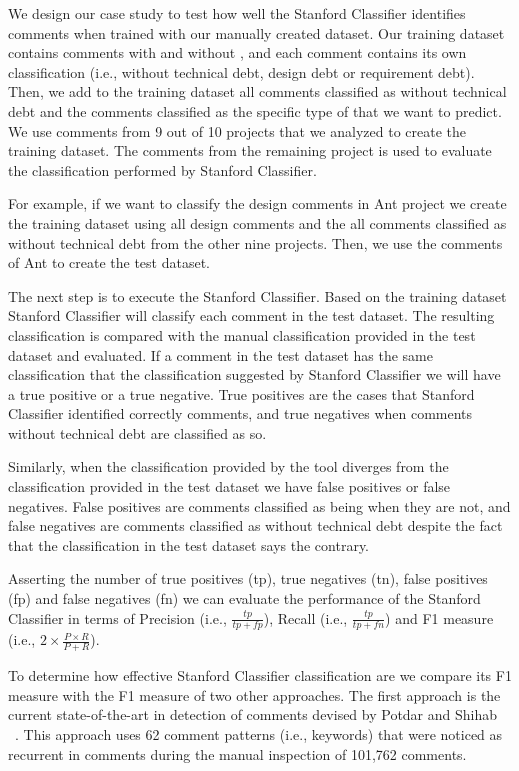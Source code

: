 We design our case study to test how well the Stanford Classifier identifies \SATD comments when trained with our manually created dataset. Our training dataset contains comments with and without \SATD, and each comment contains its own classification (i.e., without technical debt, design debt or requirement debt). Then, we add to the training dataset all comments classified as without technical debt and the comments classified as the specific type of \SATD that we want to predict. We use comments from 9 out of 10 projects that we analyzed to create the training dataset. The comments from the remaining project is used to evaluate the classification performed by Stanford Classifier.

For example, if we want to classify the design \SATD comments in Ant project we create the training dataset using all design \SATD comments and the all comments classified as without technical debt from the other nine projects. Then, we use the comments of Ant to create the test dataset. 

The next step is to execute the Stanford Classifier. Based on the training dataset Stanford Classifier will classify each comment in the test dataset. The resulting classification is compared with the manual classification provided in the test dataset and evaluated. If a comment in the test dataset has the same classification that the classification suggested by Stanford Classifier we will have a true positive or a true negative. True positives are the cases that Stanford Classifier identified correctly \SATD comments, and true negatives when comments without technical debt are classified as so. 

Similarly, when the classification provided by the tool diverges from the classification provided in the test dataset we have false positives or false negatives. False positives are comments classified as being \SATD when they are not, and false negatives are comments classified as without technical debt despite the fact that the classification in the test dataset says the contrary.

Asserting the number of true positives (tp), true negatives (tn), false positives (fp) and false negatives (fn) we can evaluate the performance of the Stanford Classifier in terms of Precision (i.e., $\frac{tp}{tp + fp}$), Recall (i.e., $\frac{tp}{tp + fn}$) and F1 measure (i.e., $2 \times \frac{P \times R}{P + R}$).

To determine how effective Stanford Classifier classification are we compare its F1 measure with the F1 measure of two other approaches. The first approach is the current state-of-the-art in detection of \SATD comments devised by Potdar and Shihab ~\cite{Potdar2014ICSME}. This approach uses 62 comment patterns (i.e., keywords) that were noticed as recurrent in \SATD comments during the manual inspection of 101,762 comments. 

